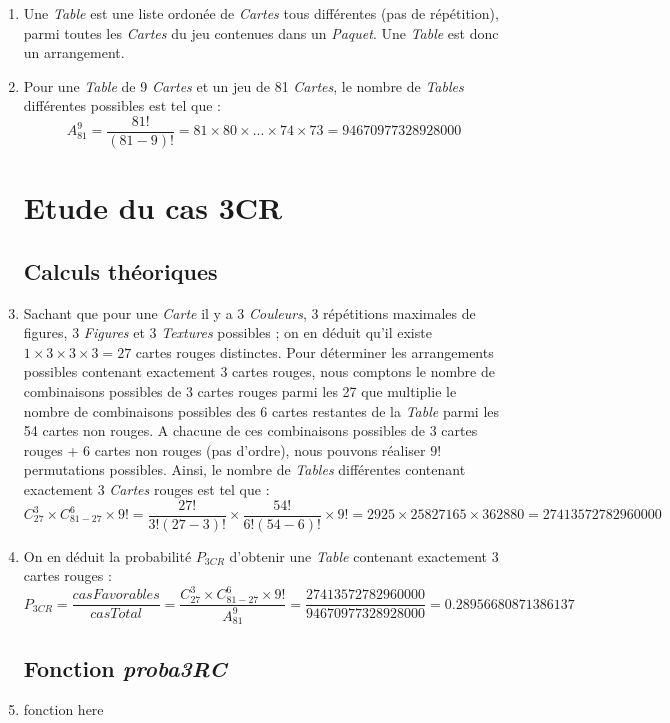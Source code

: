 \documentclass{report}
\begin{document}
\begin{enumerate}
	\item Une \textit{Table} est une liste ordonée de \textit{Cartes} tous différentes (pas de répétition), parmi toutes les \textit{Cartes} du jeu contenues dans un \textit{Paquet}. Une \textit{Table} est donc un arrangement. 
	
	\item Pour une \textit{Table} de 9 \textit{Cartes} et un jeu de 81 \textit{Cartes}, le nombre de \textit{Tables} différentes possibles est tel que : 
	\bigskip
	$$A^{9}_{81} = \frac{81!}{(81-9)!} = 81\times80\times...\times74\times73 = 94670977328928000$$
	
\section{Etude du cas 3CR}
\subsection{Calculs théoriques}
	\item Sachant que pour une \textit{Carte} il y a 3 \textit{Couleurs}, 3 répétitions maximales de figures, 3 \textit{Figures} et 3 \textit{Textures} possibles ; on en déduit qu'il existe $1\times3\times3\times3=27$ cartes rouges distinctes. Pour déterminer les arrangements possibles contenant exactement 3 cartes rouges, nous comptons le nombre de combinaisons possibles de 3 cartes rouges parmi les 27 que multiplie le nombre de combinaisons possibles des 6 cartes restantes de la \textit{Table} parmi les 54 cartes non rouges. A chacune de ces combinaisons possibles de 3 cartes rouges + 6 cartes non rouges (pas d'ordre), nous pouvons réaliser $9!$ permutations possibles. Ainsi, le nombre de \textit{Tables} différentes contenant exactement 3 \textit{Cartes} rouges est tel que :	
	$$C^{3}_{27} \times C^{6}_{81-27} \times 9! = \frac{27!}{3!(27-3)!} \times  \frac{54!}{6!(54-6)!} \times 9! = 2925 \times 25827165 \times 362880 = 27413572782960000$$

	\item On en déduit la probabilité $P_{3CR}$ d'obtenir une \textit{Table} contenant exactement 3 cartes rouges :
	$$P_{3CR} = \dfrac{casFavorables}{casTotal} = \dfrac{C^{3}_{27} \times C^{6}_{81-27} \times 9!}{A^{9}_{81}} = \dfrac{27413572782960000}{94670977328928000} = 0.28956680871386137 $$

\subsection{Fonction \textit{proba3RC}}
	\item fonction here



\end{enumerate}
\end{document}
